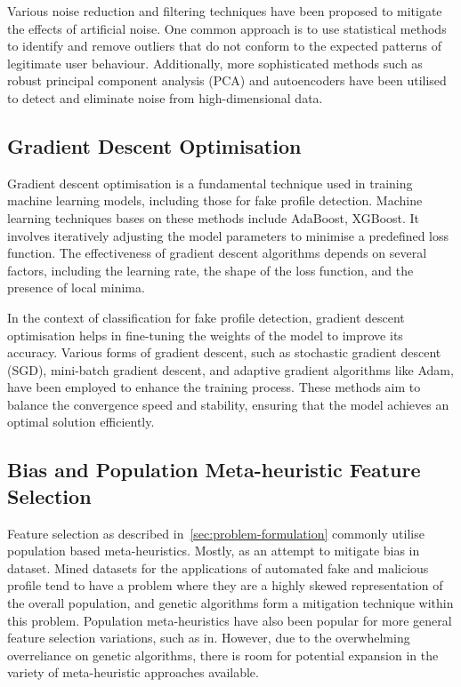 \documentclass[conference]{IEEEtran}
\begin{document}
Various noise reduction and filtering techniques have been proposed to mitigate the effects of artificial noise. One common approach is to use statistical methods to identify and remove outliers that do not conform to the expected patterns of legitimate user behaviour. Additionally, more sophisticated methods such as robust principal component analysis (PCA) and autoencoders have been utilised to detect and eliminate noise from high-dimensional data\cite{SallahEtAl2022,SansonettiEtAl2020}.

\subsection{Gradient Descent Optimisation}

Gradient descent optimisation is a fundamental technique used in training machine learning models, including those for fake profile detection. Machine learning techniques bases on these methods include AdaBoost, XGBoost. It involves iteratively adjusting the model parameters to minimise a predefined loss function. The effectiveness of gradient descent algorithms depends on several factors, including the learning rate, the shape of the loss function, and the presence of local minima.

In the context of classification for fake profile detection, gradient descent optimisation helps in fine-tuning the weights of the model to improve its accuracy. Various forms of gradient descent, such as stochastic gradient descent (SGD), mini-batch gradient descent, and adaptive gradient algorithms like Adam, have been employed to enhance the training process. These methods aim to balance the convergence speed and stability, ensuring that the model achieves an optimal solution efficiently\cite{PurbaEtAl2020}.

\subsection{Bias and Population Meta-heuristic Feature Selection}

Feature selection as described in~\autoref{sec:problem-formulation} commonly utilise population based meta-heuristics. Mostly, as an attempt to mitigate bias in dataset. Mined datasets for the applications of automated fake and malicious profile tend to have a problem where they are a highly skewed representation of the overall population, and genetic algorithms form a mitigation technique within this problem\cite{AkyonKalfaoglu2019,KaushikEtAl2022}. Population meta-heuristics have also been popular for more general feature selection variations, such as in\cite{AltunbeyOzbayAlatas2019,ArabAlfi2015,CottaEtAl2018}. However, due to the overwhelming overreliance on genetic algorithms, there is room for potential expansion in the variety of meta-heuristic approaches available.
\end{document}

